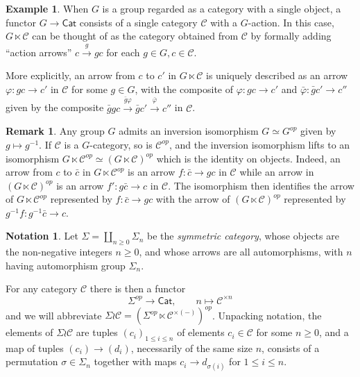 \documentclass[a4paper,10pt
,draft
]{article}%
\numberwithin{equation}{section}
\numberwithin{figure}{section}
\theoremstyle{definition} %
\newtheorem{example}[equation]{Example}%
\newtheorem{remark}[equation]{Remark}%
\newtheorem{notation}[equation]{Notation}%
\newcommand{\longto}{\longrightarrow}%
\newcommand{\Cat}{\mathsf{Cat}}
\newcommand{\C}{\ensuremath{\mathcal C}}
\newcommand{\1}{\ensuremath{\mathbbm 1}}%
\begin{document}
\begin{example}\label{GLTIMES EQ}
When $G$ is a group regarded as a category with a single object,
a functor
$G \to \mathsf{Cat}$
consists of a single category $\C$ with a $G$-action.
%
In this case, $G \ltimes \mathcal{C}$
can be thought of as the category obtained from $\mathcal{C}$
by formally adding ``action arrows''
$c \xrightarrow{g} gc$ for each $g\in G,c\in \mathcal{C}$.

More explicitly, an arrow from $c$ to $c'$
in $G \ltimes \mathcal{C}$
is uniquely described as an arrow
$\varphi \colon gc \to c'$ in $\mathcal{C}$ for some $g \in G$,
with the composite of 
$\varphi \colon gc \to c'$
and
$\bar{\varphi} \colon \bar{g}c' \to c''$
given by
the composite
$ \bar{g}g c \xrightarrow{\bar{g} \varphi} \bar{g}c' \xrightarrow{\bar{\varphi}} c''$ in $\C$.
\end{example}




\begin{remark}\label{INVLTIMES REM}
	Any group $G$ admits an inversion isomorphism
	$G \simeq G^{op}$ given by $g \mapsto g^{-1}$.
	If $\mathcal{C}$ is a $G$-category, 
	so is $\mathcal{C}^{op}$,
	and the inversion isomorphism lifts
	to an isomorphism
	$G \ltimes \mathcal{C}^{op} \simeq \left(G \ltimes \mathcal{C}\right)^{op}$ which is the identity on objects.
	Indeed, an arrow from $c$ to $\bar{c}$
	in $G \ltimes \mathcal{C}^{op}$
	is an arrow $f \colon \bar{c} \to gc$ in $\mathcal{C}$
	while an arrow in $\left(G \ltimes \mathcal{C}\right)^{op}$
	is an arrow
	$f' \colon g \bar{c} \to c$ in $\mathcal{C}$.
	The isomorphism then identifies 
	the arrow of $G \ltimes \mathcal{C}^{op}$
	represented by
	$f \colon \bar{c} \to gc$ 
	with the arrow of $\left(G \ltimes \mathcal{C}\right)^{op}$
	represented by
	$g^{-1}f \colon g^{-1}\bar{c} \to c$.
\end{remark}




\begin{notation}\label{SIGWR NOT}
Let $\Sigma = \coprod_{n \geq 0} \Sigma_n$
be the \emph{symmetric category},
whose objects are the non-negative integers $n\geq 0$,
and whose arrows are all automorphisms,
with $n$ having automorphism group $\Sigma_n$.
 
For any category $\mathcal{C}$ there is then a functor
\begin{equation}
	\Sigma^{op} \longto \Cat,
	\qquad
	n \mapsto \mathcal C^{\times n}
\end{equation}
and we will abbreviate
$\Sigma \wr \C = 
\left(\Sigma^{op} \ltimes \mathcal C^{\times (-)}\right)^{op}$.
%
Unpacking notation, 
the elements of $\Sigma \wr \mathcal{C}$
are tuples
$(c_i)_{1 \leq i \leq n}$
of elements $c_i \in \mathcal{C}$ for some $n \geq 0$,
and a map of tuples $(c_i) \to (d_i)$, 
necessarily of the same size $n$,
consists of a permutation 
$\sigma \in \Sigma_n$
together with maps
$c_i \to d_{\sigma(i)}$
for $1 \leq i \leq n$.
\end{notation}
\end{document}
